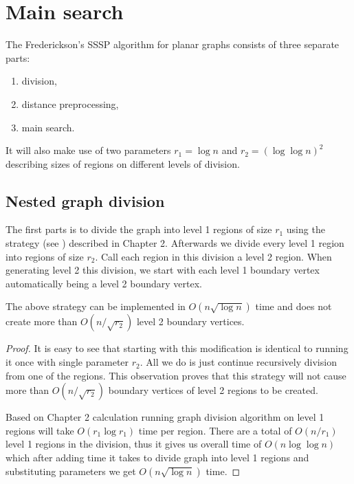 \section{Main search}

The Frederickson's SSSP algorithm for planar graphs consists of three separate parts:
\begin{enumerate}
    \item division,
    \item distance preprocessing,
    \item main search.
\end{enumerate}

It will also make use of two parameters $r_1 = \log n$ and $r_2 = (\log \log n)^2$ describing sizes of regions on different levels of division.

\subsection{Nested graph division}

The first parts is to divide the graph into level 1 regions of size $r_1$ using the strategy (see ) described in Chapter 2. Afterwards we divide every level 1 region into regions of size $r_2$. Call each region in this division a level 2 region. When generating level 2 this division, we start with each level 1 boundary vertex automatically being a level 2 boundary vertex. 


\begin{lemma}
The above strategy can be implemented in $O(n\sqrt{\log n})$ time and does not create more than $O(n/\sqrt{r_2})$ level 2 boundary vertices.
\end{lemma}

\begin{proof}
It is easy to see that starting  with this modification is identical to running it once with single parameter $r_2$. All we do is just continue recursively division from one of the regions. This observation proves that this strategy will not cause more than $O(n/\sqrt{r_2})$ boundary vertices of level 2 regions to be created.

Based on Chapter 2 calculation running graph division algorithm on level 1 regions will take $O(r_1 \log r_1)$ time per region. There are a total of $O(n/r_1)$ level 1 regions in the division, thus it gives us overall time of $O(n \log\log n)$ which after adding time it takes to divide graph into level 1 regions and substituting parameters we get $O(n\sqrt{\log n})$ time.
\end{proof}

